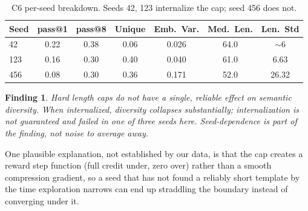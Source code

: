 \documentclass{article}
\newtheorem{finding}{Finding}
\begin{document}
\begin{table}[h]
\centering
\caption{C6 per-seed breakdown. Seeds 42, 123 internalize the cap; seed 456 does not.}
\label{tab:c6_seeds}
\small
\begin{tabular}{lcccccc}
\toprule
\textbf{Seed} & \textbf{pass@1} & \textbf{pass@8} & \textbf{Unique} & \textbf{Emb.\ Var.} & \textbf{Med.\ Len.} & \textbf{Len.\ Std} \\
\midrule
42  & 0.22 & 0.38 & 0.06 & 0.026 & 64.0 & $\sim$6 \\
123 & 0.16 & 0.30 & 0.40 & 0.040 & 61.0 & 6.63 \\
456 & 0.08 & 0.30 & 0.36 & 0.171 & 52.0 & 26.32 \\
\bottomrule
\end{tabular}
\end{table}

\begin{finding}
\label{find:c6bimodal}
Hard length caps do not have a single, reliable effect on semantic diversity. When internalized, diversity collapses substantially; internalization is not guaranteed and failed in one of three seeds here. Seed-dependence is part of the finding, not noise to average away.
\end{finding}

One plausible explanation, not established by our data, is that the cap creates a reward step function (full credit under, zero over) rather than a smooth compression gradient, so a seed that has not found a reliably short template by the time exploration narrows can end up straddling the boundary instead of converging under it.
\end{document}
